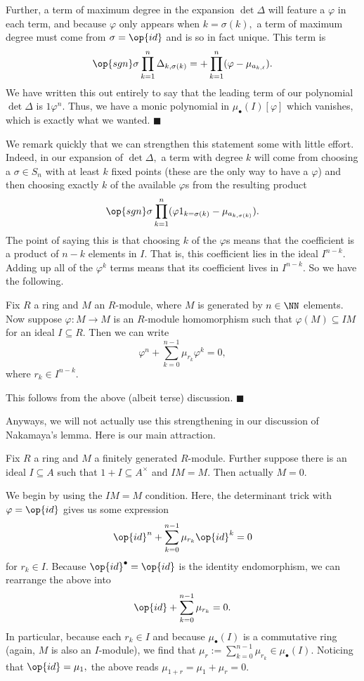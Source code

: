 Further, a term of maximum degree in the expansion $\det\Delta$ will feature a $\varphi$ in each term, and because $\varphi$ only appears when $k=\sigma(k),$ a term of maximum degree must come from $\sigma=\op{id}$ and is so in fact unique. This term is
\[\op{sgn}\sigma\prod_{k=1}^n\Delta_{k,\sigma(k)}=+\prod_{k=1}^n(\varphi-\mu_{a_{k,\ell}}).\]
We have written this out entirely to say that the leading term of our polynomial $\det\Delta$ is $1\varphi^n.$ Thus, we have a monic polynomial in $\mu_\bullet(I)[\varphi]$ which vanishes, which is exactly what we wanted. $\blacksquare$

We remark quickly that we can strengthen this statement some with little effort. Indeed, in our expansion of $\det\Delta,$ a term with degree $k$ will come from choosing a $\sigma\in S_n$ with at least $k$ fixed points (these are the only way to have a $\varphi$) and then choosing exactly $k$ of the available $\varphi$s from the resulting product
\[\op{sgn}\sigma\prod_{k=1}^n(\varphi1_{k=\sigma(k)}-\mu_{a_{k,\sigma(k)}}).\]
The point of saying this is that choosing $k$ of the $\varphi$s means that the coefficient is a product of $n-k$ elements in $I.$ That is, this coefficient lies in the ideal $I^{n-k}.$ Adding up all of the $\varphi^k$ terms means that its coefficient lives in $I^{n-k}.$ So we have the following.
\begin{proposition}
    Fix $R$ a ring and $M$ an $R$-module, where $M$ is generated by $n\in\NN$ elements. Now suppose $\varphi:M\to M$ is an $R$-module homomorphism such that $\varphi(M)\subseteq IM$ for an ideal $I\subseteq R.$ Then we can write
    \[\varphi^n+\sum_{k=0}^{n-1}\mu_{r_k}\varphi^k=0,\]
    where $r_k\in I^{n-k}.$
\end{proposition}
This follows from the above (albeit terse) discussion. $\blacksquare$

Anyways, we will not actually use this strengthening in our discussion of Nakamaya's lemma. Here is our main attraction.
\begin{theorem}
    Fix $R$ a ring and $M$ a finitely generated $R$-module. Further suppose there is an ideal $I\subseteq A$ such that $1+I\subseteq A^\times$ and $IM=M.$ Then actually $M=0.$
\end{theorem}
We begin by using the $IM=M$ condition. Here, the determinant trick with $\varphi=\op{id}$ gives us some expression
\[\op{id}^n+\sum_{k=0}^{n-1}\mu_{r_k}\op{id}^k=0\]
for $r_k\in I.$ Because $\op{id}^\bullet=\op{id}$ is the identity endomorphism, we can rearrange the above into
\[\op{id}+\sum_{k=0}^{n-1}\mu_{r_k}=0.\]
In particular, because each $r_k\in I$ and because $\mu_\bullet(I)$ is a commutative ring (again, $M$ is also an $I$-module), we find that $\mu_r:=\sum_{k=0}^{n-1}\mu_{r_k}\in\mu_\bullet(I).$ Noticing that $\op{id}=\mu_1,$ the above reads $\mu_{1+r}=\mu_1+\mu_r=0.$

